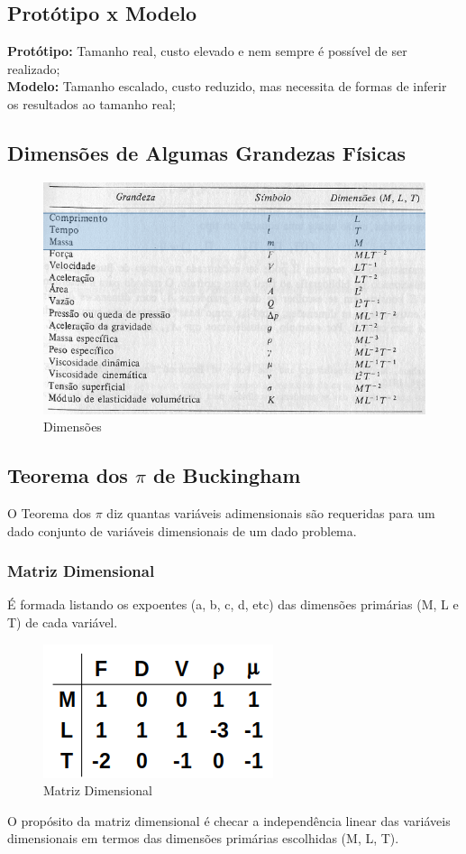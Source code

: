 \documentclass[a4paper, 12pt]{article}
\begin{document}
\subsection{Protótipo x Modelo}
	\textbf{Protótipo:}
	Tamanho real, custo elevado e nem sempre é possível de ser realizado;\\
	
	\textbf{Modelo:}
	Tamanho escalado, custo reduzido, mas necessita de formas de inferir os resultados ao tamanho real;

\subsection{Dimensões de Algumas Grandezas Físicas}
\begin{figure}[h]
	\centering
	\includegraphics[width=0.9\linewidth]{imagens/dim}
	\caption{Dimensões}
	\label{fig:dim}
\end{figure}

\subsection{Teorema dos $\pi$ de Buckingham}
	O Teorema dos $\pi$ diz quantas variáveis adimensionais são requeridas para um dado conjunto de variáveis dimensionais de um dado problema.
\subsubsection{Matriz Dimensional}
	É formada listando os expoentes (a, b, c, d, etc) das dimensões primárias (M, L e T) de cada variável.
	\begin{figure}[h]
		\centering
		\includegraphics[width=0.5\linewidth]{imagens/mat}
		\caption{Matriz Dimensional}
		\label{fig:mat}
	\end{figure}
	O propósito da matriz dimensional é checar a independência linear das variáveis dimensionais em termos das dimensões primárias escolhidas (M, L, T).
	
\end{document}
